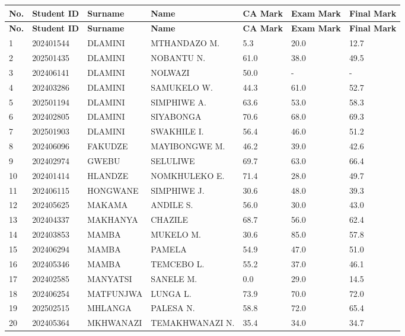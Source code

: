 \documentclass[12pt]{article}
\begin{document}
\begin{longtable}{@{}lllllll@{}}
\toprule
\textbf{No.} & \textbf{Student ID} & \textbf{Surname} & \textbf{Name} & \textbf{CA Mark} & \textbf{Exam Mark} & \textbf{Final Mark} \\
\midrule
\endfirsthead

\toprule
\textbf{No.} & \textbf{Student ID} & \textbf{Surname} & \textbf{Name} & \textbf{CA Mark} & \textbf{Exam Mark} & \textbf{Final Mark} \\
\midrule
\endhead

\bottomrule
\endfoot

1 & 202401544 & DLAMINI & MTHANDAZO M. & 5.3 & 20.0 & 12.7 \\
2 & 202501435 & DLAMINI & NOBANTU N. & 61.0 & 38.0 & 49.5 \\
3 & 202406141 & DLAMINI & NOLWAZI & 50.0 & - & - \\
4 & 202403286 & DLAMINI & SAMUKELO W. & 44.3 & 61.0 & 52.7 \\
5 & 202501194 & DLAMINI & SIMPHIWE A. & 63.6 & 53.0 & 58.3 \\
6 & 202402805 & DLAMINI & SIYABONGA & 70.6 & 68.0 & 69.3 \\
7 & 202501903 & DLAMINI & SWAKHILE I. & 56.4 & 46.0 & 51.2 \\
8 & 202406096 & FAKUDZE & MAYIBONGWE M. & 46.2 & 39.0 & 42.6 \\
9 & 202402974 & GWEBU & SELULIWE & 69.7 & 63.0 & 66.4 \\
10 & 202401414 & HLANDZE & NOMKHULEKO E. & 71.4 & 28.0 & 49.7 \\
11 & 202406115 & HONGWANE & SIMPHIWE J. & 30.6 & 48.0 & 39.3 \\
12 & 202405625 & MAKAMA & ANDILE S. & 56.0 & 30.0 & 43.0 \\
13 & 202404337 & MAKHANYA & CHAZILE & 68.7 & 56.0 & 62.4 \\
14 & 202403853 & MAMBA & MUKELO M. & 30.6 & 85.0 & 57.8 \\
15 & 202406294 & MAMBA & PAMELA & 54.9 & 47.0 & 51.0 \\
16 & 202405346 & MAMBA & TEMCEBO L. & 55.2 & 37.0 & 46.1 \\
17 & 202402585 & MANYATSI & SANELE M. & 0.0 & 29.0 & 14.5 \\
18 & 202406254 & MATFUNJWA & LUNGA L. & 73.9 & 70.0 & 72.0 \\
19 & 202502515 & MHLANGA & PALESA N. & 58.8 & 72.0 & 65.4 \\
20 & 202405364 & MKHWANAZI & TEMAKHWANAZI N. & 35.4 & 34.0 & 34.7 \\

\end{longtable}
\end{document}
